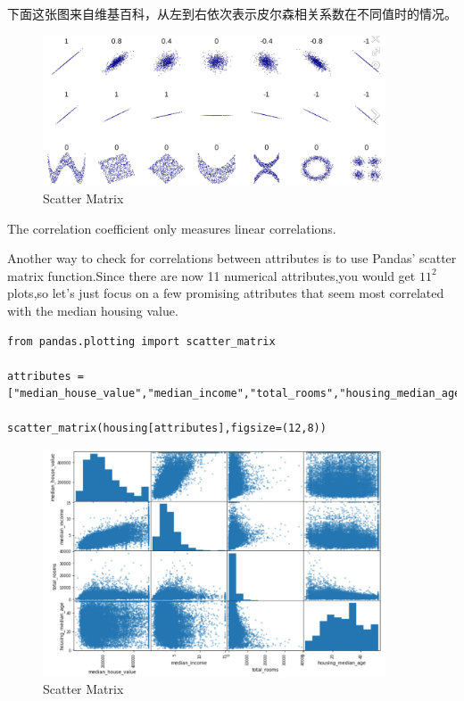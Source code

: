 \documentclass[UTF8]{ctexart}
\begin{document}
下面这张图来自维基百科，从左到右依次表示皮尔森相关系数在不同值时的情况。

\begin{figure}[H]
\centering
\includegraphics[width = 4in]{scatter_matrix.JPG}
\caption{Scatter Matrix}
\end{figure}

The correlation coefficient only measures linear correlations.

Another way to check for correlations between attributes is to use Pandas' scatter\underline{ }matrix function.Since there are now 11 numerical attributes,you would get $11^2$ plots,so let's just focus on a few promising attributes that seem most correlated with the median housing value.

\begin{lstlisting}
from pandas.plotting import scatter_matrix

attributes = ["median_house_value","median_income","total_rooms","housing_median_age"]

scatter_matrix(housing[attributes],figsize=(12,8))
\end{lstlisting}


\begin{figure}[H]
\centering
\includegraphics[width = 4in]{scatter_col.JPG}
\caption{Scatter Matrix}
\end{figure}
\end{document}
